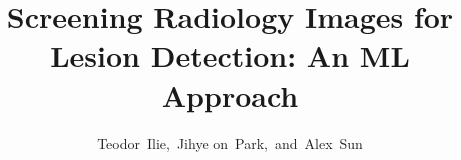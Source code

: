 %



\documentclass[journal]{IEEEtran}

\usepackage{xcolor,soul,framed} %

\usepackage[pdftex]{graphicx}
\graphicspath{{../pdf/}{../jpeg/}}

\usepackage[cmex10]{amsmath}
\usepackage{array}
\usepackage{mdwmath}
\usepackage{mdwtab}
\usepackage{eqparbox}
\usepackage{url}





    \title{Screening  Radiology  Images  for Lesion  Detection: An ML Approach}
  \author{Teodor~Ilie,~Jihye    on~Park,~and~Alex~Sun%

}  

\markboth{}{}

\maketitle


\begin{abstract}
This is the abstract.
\end{abstract}

\begin{IEEEkeywords}
Radiology, DeepLesion, Convolutional Neural Network, U-Net, YOLO
\end{IEEEkeywords}


